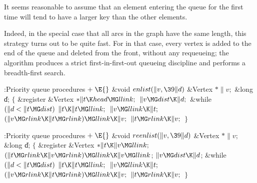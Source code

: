 It seems reasonable to assume that an element entering the queue for the
first time will tend to have a larger key than the other elements.

Indeed, in the special case that all arcs in the graph have the same
length, this strategy turns out to be quite fast. For in that case,
every vertex is added to the end of the queue and deleted from the
front, without any requeueing; the algorithm produces a strict
first-in-first-out queueing discipline and performs a breadth-first search.

\Y\B\4:Priority queue procedures\X${}\mathrel+\E{}$\6
\&{void} ${}\\{enlist}(\|v,\39\|d){}$\1\1\6
\&{Vertex} ${}{*}\|v;{}$\6
\&{long} \|d;\2\2\6
${}\{{}$\5
\1\&{register} \&{Vertex} ${}{*}\|t\K\\{head}\MG\\{llink};{}$\7
${}\|v\MG\\{dist}\K\|d;{}$\6
\&{while} ${}(\|d<\|t\MG\\{dist}){}$\1\5
${}\|t\K\|t\MG\\{llink};{}$\2\6
${}\|v\MG\\{llink}\K\|t;{}$\6
${}(\|v\MG\\{rlink}\K\|t\MG\\{rlink})\MG\\{llink}\K\|v;{}$\6
${}\|t\MG\\{rlink}\K\|v;{}$\6
\4${}\}{}$\2\par
\fi

\B{}:Priority queue procedures\X${}\mathrel+\E{}$\6
\&{void} ${}\\{reenlist}(\|v,\39\|d){}$\1\1\6
\&{Vertex} ${}{*}\|v;{}$\6
\&{long} \|d;\2\2\6
${}\{{}$\5
\1\&{register} \&{Vertex} ${}{*}\|t\K\|v\MG\\{llink};{}$\7
${}(\|t\MG\\{rlink}\K\|v\MG\\{rlink})\MG\\{llink}\K\|v\MG\\{llink}{}$;\6
${}\|v\MG\\{dist}\K\|d{}$;\6
\&{while} ${}(\|d<\|t\MG\\{dist}){}$\1\5
${}\|t\K\|t\MG\\{llink};{}$\2\6
${}\|v\MG\\{llink}\K\|t;{}$\6
${}(\|v\MG\\{rlink}\K\|t\MG\\{rlink})\MG\\{llink}\K\|v;{}$\6
${}\|t\MG\\{rlink}\K\|v;{}$\6
\4${}\}{}$\2\par
\fi


